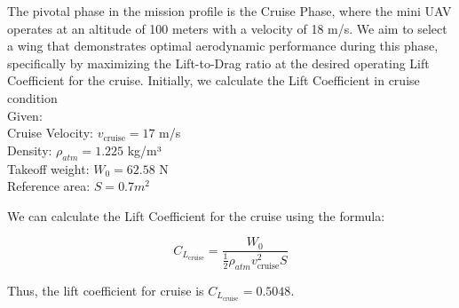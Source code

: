 \documentclass[12 pt]{article}
\begin{document}

\color{black}
The pivotal phase in the mission profile is the Cruise Phase, where the mini UAV operates at an altitude of 100 meters with a velocity of 18 m/s. We aim to select a wing that demonstrates optimal aerodynamic performance during this phase, specifically by maximizing the Lift-to-Drag ratio at the desired operating Lift Coefficient for the cruise. Initially, we calculate the Lift Coefficient in cruise condition \\
Given:\\
 Cruise Velocity: \( v_{\text{cruise}} = 17 \) m/s\\
Density: \( \rho_{atm} = 1.225 \) kg/m³\\
 Takeoff weight: \( W_0 = 62.58 \) N\\
 Reference area: \(S = 0.7 m^2\) 

We can calculate the Lift Coefficient for the cruise using the formula:

\[
C_{L_{\text{cruise}}} = \frac{W_0}{\frac{1}{2} \rho_{atm} v_{\text{cruise}}^2 S}    \tag{6.1} \]

Thus, the lift coefficient for cruise is \( C_{L_{\text{cruise}}} = 0.5048 \). 
\color{red}
\end{document}
